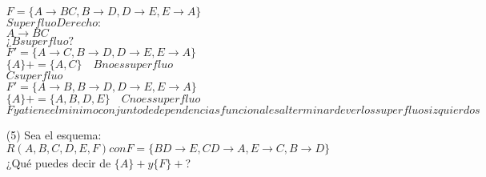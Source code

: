 \documentclass{article}
\begin{document}
\begin{enumerate}
$F=\{A \rightarrow BC, B\rightarrow D, D\rightarrow E, E \rightarrow A\}$ \\
$Superfluo Derecho:$\\
$A\rightarrow BC$\\
$¿B superfluo?$\\
$F'=\{A \rightarrow C, B \rightarrow D, D\rightarrow E, E\rightarrow A\}$\\
$\{A\}+=\{A,C\} \quad B no es superfluo$\\
$C superfluo$\\
$F'=\{A \rightarrow B, B \rightarrow D, D\rightarrow E, E \rightarrow A\}$\\
$\{A\}+=\{A,B,D,E\} \quad C no es superfluo$\\
$F ya tiene el minimo conjunto de dependencias funcionales al terminar de ver los superfluos izquierdos$\\
\item[(5)] Sea el esquema:\\
$R(A,B,C,D,E,F) con F=\{BD \rightarrow E, CD \rightarrow A, E \rightarrow C, B \rightarrow D\}$\\
¿Qué puedes decir de $\{A\}+ y \{F\}+$?


\end{enumerate}
\end{document}
